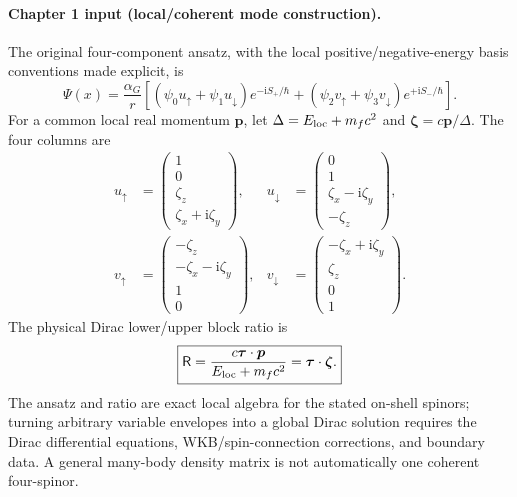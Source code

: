 \documentclass[11pt,a4paper]{article}
\theoremstyle{remark}
\newcommand{\ii}{\mathrm i}
\begin{document}
\paragraph{Chapter 1 input (local/coherent mode construction).}
The original four-component ansatz, with the local positive/negative-energy basis conventions made explicit, is
\begin{equation}\label{eq:originalPsi}
\boxed{\Psi(x)=\frac{\alpha_G}{r}\left[
 (\psi_0u_\uparrow+\psi_1u_\downarrow)e^{-\ii S_+/\hbar}
 +(\psi_2v_\uparrow+\psi_3v_\downarrow)e^{+\ii S_-/\hbar}\right].}
\end{equation}
For a common local real momentum $\bm p$, let $\Delta=E_{\rm loc}+m_fc^2$ and $\bm\zeta=c\bm p/\Delta$. The four columns are
\begin{equation}\label{eq:fourcolumns}
\begin{aligned}
 u_\uparrow&=\begin{pmatrix}1\\0\\\zeta_z\\\zeta_x+\ii\zeta_y\end{pmatrix},&
 u_\downarrow&=\begin{pmatrix}0\\1\\\zeta_x-\ii\zeta_y\\-\zeta_z\end{pmatrix},\\
 v_\uparrow&=\begin{pmatrix}-\zeta_z\\-\zeta_x-\ii\zeta_y\\1\\0\end{pmatrix},&
 v_\downarrow&=\begin{pmatrix}-\zeta_x+\ii\zeta_y\\\zeta_z\\0\\1\end{pmatrix}.
\end{aligned}
\end{equation}
The physical Dirac lower/upper block ratio is
\begin{equation}\label{eq:ratio}
 \boxed{\mathsf R=\frac{c\bm\tau\cdot\bm p}{E_{\rm loc}+m_fc^2}=\bm\tau\cdot\bm\zeta.}
\end{equation}
The ansatz and ratio are exact local algebra for the stated on-shell spinors; turning arbitrary variable envelopes into a global Dirac solution requires the Dirac differential equations, WKB/spin-connection corrections, and boundary data. A general many-body density matrix is not automatically one coherent four-spinor.
\end{document}
